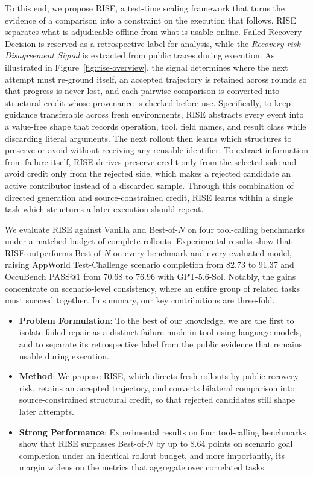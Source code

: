 \documentclass{article}
\newcommand{\method}{RISE\xspace}
\begin{document}
To this end, we propose \method, a test-time scaling framework that turns the evidence of a comparison into a constraint on the execution that follows. \method separates what is adjudicable offline from what is usable online. Failed Recovery Decision is reserved as a retrospective label for analysis, while the \emph{Recovery-risk Disagreement Signal} is extracted from public traces during execution. As illustrated in Figure~\ref{fig:rise-overview}, the signal determines where the next attempt must re-ground itself, an accepted trajectory is retained across rounds so that progress is never lost, and each pairwise comparison is converted into structural credit whose provenance is checked before use. Specifically, to keep guidance transferable across fresh environments, \method abstracts every event into a value-free shape that records operation, tool, field names, and result class while discarding literal arguments. The next rollout then learns which structures to preserve or avoid without receiving any reusable identifier. To extract information from failure itself, \method derives preserve credit only from the selected side and avoid credit only from the rejected side, which makes a rejected candidate an active contributor instead of a discarded sample. Through this combination of directed generation and source-constrained credit, \method learns within a single task which structures a later execution should repeat.

We evaluate \method against Vanilla and \mbox{Best-of-$N$} on four tool-calling benchmarks under a matched budget of complete rollouts. Experimental results show that \method outperforms \mbox{Best-of-$N$} on every benchmark and every evaluated model, raising AppWorld Test-Challenge scenario completion from 82.73 to 91.37 and OccuBench PASS@1 from 70.68 to 76.96 with GPT-5.6-Sol. Notably, the gains concentrate on scenario-level consistency, where an entire group of related tasks must succeed together. In summary, our key contributions are three-fold.
\begin{itemize}[leftmargin=1em, itemsep=-1ex, topsep=0ex]
    \item \textbf{Problem Formulation}: To the best of our knowledge, we are the first to isolate failed repair as a distinct failure mode in tool-using language models, and to separate its retrospective label from the public evidence that remains usable during execution.
    \item \textbf{Method}: We propose \method, which directs fresh rollouts by public recovery risk, retains an accepted trajectory, and converts bilateral comparison into source-constrained structural credit, so that rejected candidates still shape later attempts.
    \item \textbf{Strong Performance}: Experimental results on four tool-calling benchmarks show that \method surpasses \mbox{Best-of-$N$} by up to 8.64 points on scenario goal completion under an identical rollout budget, and more importantly, its margin widens on the metrics that aggregate over correlated tasks.
\end{itemize}
\end{document}
